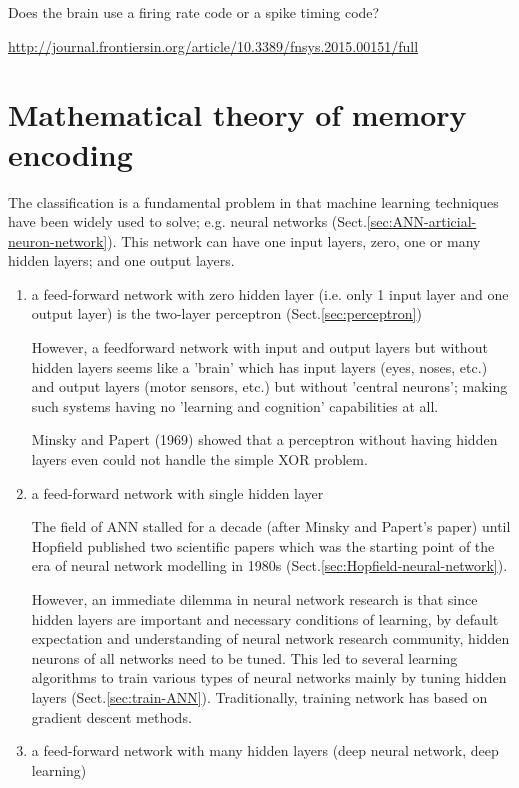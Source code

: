 Does the brain use a firing rate code or a spike timing code?

\url{http://journal.frontiersin.org/article/10.3389/fnsys.2015.00151/full}




\chapter{Mathematical theory of memory encoding}

The classification is a fundamental problem in that machine learning techniques
have been widely used to solve;  e.g. neural networks
(Sect.\ref{sec:ANN-articial-neuron-network}). This network can have one input
layers, zero, one or many hidden layers; and one output layers.

\begin{enumerate}
  \item a feed-forward network with zero hidden layer (i.e. only 1 input layer
  and one output layer) is the two-layer perceptron (Sect.\ref{sec:perceptron})


However, a  feedforward  network  with input  and  output  layers  but  without 
hidden  layers  seems like a 'brain' which has input layers (eyes, noses,
etc.) and output  layers  (motor  sensors,  etc.)  but  without  'central
neurons'; making such systems having no  'learning  and  cognition' 
capabilities at  all.

Minsky and Papert (1969) showed that a perceptron without having hidden  layers 
even  could  not  handle  the  simple  XOR problem.
  
  \item a feed-forward network with single hidden layer
  
The field of ANN stalled for a decade (after Minsky and Papert's paper) until
Hopfield published two  scientific papers which was the starting point of the
era of neural network modelling in 1980s
(Sect.\ref{sec:Hopfield-neural-network}).

However, an immediate dilemma in neural network research  is  that  since hidden
 layers  are  important  and necessary  conditions  of  learning,  by default 
expectation and understanding of neural network research community, hidden 
neurons  of  all  networks  need  to  be  tuned.
This led to several learning  algorithms  to  train  various  types  of neural 
networks  mainly  by  tuning  hidden  layers (Sect.\ref{sec:train-ANN}).
Traditionally, training network has based on gradient descent methods.
  
  \item a feed-forward network with many hidden layers (deep neural network,
  deep learning)
\end{enumerate}



